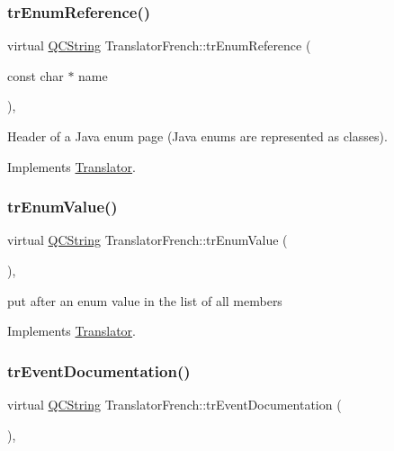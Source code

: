 \subsubsection{\texorpdfstring{trEnumReference()}{trEnumReference()}}
{\footnotesize\ttfamily virtual \mbox{\hyperlink{class_q_c_string}{Q\+C\+String}} Translator\+French\+::tr\+Enum\+Reference (\begin{DoxyParamCaption}\item[{const char $\ast$}]{name }\end{DoxyParamCaption})\hspace{0.3cm}{\ttfamily [inline]}, {\ttfamily [virtual]}}

Header of a Java enum page (Java enums are represented as classes). 

Implements \mbox{\hyperlink{class_translator}{Translator}}.

\mbox{\label{class_translator_french_a187b3fca95b6af51035e78436d0f45c6}} 
\subsubsection{\texorpdfstring{trEnumValue()}{trEnumValue()}}
{\footnotesize\ttfamily virtual \mbox{\hyperlink{class_q_c_string}{Q\+C\+String}} Translator\+French\+::tr\+Enum\+Value (\begin{DoxyParamCaption}{ }\end{DoxyParamCaption})\hspace{0.3cm}{\ttfamily [inline]}, {\ttfamily [virtual]}}

put after an enum value in the list of all members 

Implements \mbox{\hyperlink{class_translator}{Translator}}.

\mbox{\label{class_translator_french_a8c5a33dd30ddd01a18d2026044f72555}} 
\subsubsection{\texorpdfstring{trEventDocumentation()}{trEventDocumentation()}}
{\footnotesize\ttfamily virtual \mbox{\hyperlink{class_q_c_string}{Q\+C\+String}} Translator\+French\+::tr\+Event\+Documentation (\begin{DoxyParamCaption}{ }\end{DoxyParamCaption})\hspace{0.3cm}{\ttfamily [inline]}, {\ttfamily [virtual]}}

